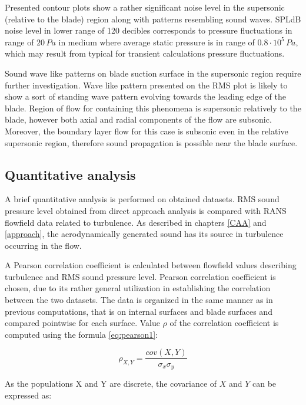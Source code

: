 Presented contour plots show a rather significant noise level in the supersonic (relative to the blade) region along with patterns resembling sound waves. SPLdB noise level in lower range of 120 decibles corresponds to pressure fluctuations in range of $20 \, Pa$ in medium where average static pressure is in range of $0.8 \cdot 10^5 \, Pa$, which may result from typical for transient calculations pressure fluctuations. 

Sound wave like patterns on blade suction surface in the supersonic region require further investigation. Wave like pattern presented on the RMS plot is likely to show a sort of standing wave pattern evolving towards the leading edge of the blade. Region of flow for containing this phenomena is supersonic relatively to the blade, however both axial and radial components of the flow are subsonic. Moreover, the boundary layer flow for this case is subsonic even in the relative supersonic region, therefore sound propagation is possible near the blade surface.

\subsection{Quantitative analysis} \label{rms_res_quant}

A brief quantitative analysis is performed on obtained datasets. RMS sound pressure level obtained from direct approach analysis is compared with RANS flowfield data related to turbulence. As described in chapters \ref{CAA} and  \ref{approach}, the aerodynamically generated sound has its source in turbulence occurring in the flow.

A Pearson correlation coefficient is calculated between flowfield values describing turbulence and RMS sound pressure level. Pearson correlation coefficient is chosen, due to its rather general utilization in establishing the correlation between the two datasets. The data is organized in the same manner as in previous computations, that is on internal surfaces and blade surfaces and compared pointwise for each surface. Value $\rho$ of the correlation coefficient is computed using the formula \ref{eq:pearson1}:

\begin{equation} \label{eq:pearson1}
\rho_{X, Y} = \frac{cov \left( X, Y \right)}{\sigma_x \sigma_y}
\end{equation}

\noindent As the populations X and Y are discrete, the covariance of $X$ and $Y$ can be expressed as:

